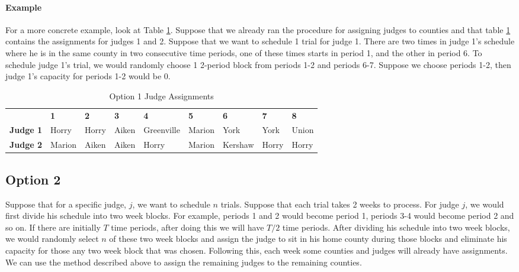 \documentclass[11pt]{article}
\begin{document}
    \paragraph{Example}
    For a more concrete example, look at Table \ref{tab:op1}. Suppose that we already ran the procedure for assigning judges to counties and that table \ref{tab:op1} contains the assignments for judges 1 and 2. Suppose that we want to schedule 1 trial for judge 1. There are two times in judge 1's schedule where he is in the same county in two consecutive time periods, one of these times starts in period 1, and the other in period 6. To schedule judge 1's trial, we would randomly choose 1 2-period block from periods 1-2 and periods 6-7. Suppose we choose periods 1-2, then judge 1's capacity for periods 1-2 would be 0.

    \begin{table}[H]
      \centering
      \caption{Option 1 Judge Assignments}
      \label{tab:op1}
      \begin{tabular}{lllllllll}
                       & \textbf{1} & \textbf{2} & \textbf{3} & \textbf{4} & \textbf{5} & \textbf{6} & \textbf{7} & \textbf{8} \\
      \textbf{Judge 1} & Horry      & Horry      & Aiken      & Greenville & Marion     & York       & York       & Union      \\
      \textbf{Judge 2} & Marion     & Aiken      & Aiken      & Horry      & Marion     & Kershaw    & Horry      & Horry
      \end{tabular}
    \end{table}


  \subsection{Option 2}
    Suppose that for a specific judge, $j$, we want to schedule $n$ trials. Suppose that each trial takes 2 weeks to process. For judge $j$, we would first divide his schedule into two week blocks. For example, periods 1 and 2 would become period 1, periods 3-4 would become period 2 and so on. If there are initially $T$ time periods, after doing this we will have $T/2$ time periods. After dividing his schedule into two week blocks, we would randomly select $n$ of these two week blocks and assign the judge to sit in his home county during those blocks and eliminate his capacity for those any two week block that was chosen. Following this, each week some counties and judges will already have assignments. We can use the method described above to assign the remaining judges to the remaining counties.
\end{document}
